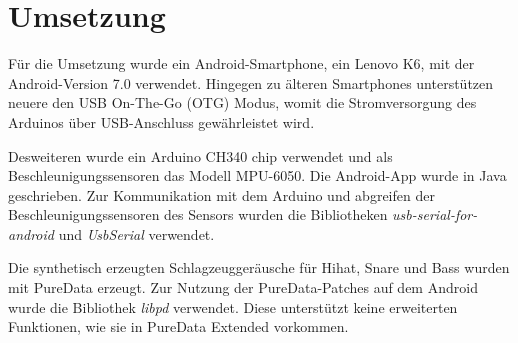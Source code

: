 \section{Umsetzung}
Für die Umsetzung wurde ein Android-Smartphone, ein Lenovo K6, mit der Android-Version 7.0 verwendet.
Hingegen zu älteren Smartphones unterstützen neuere den USB On-The-Go (OTG) Modus, womit die Stromversorgung des Arduinos über USB-Anschluss gewährleistet wird.

Desweiteren wurde ein Arduino CH340 chip verwendet und als Beschleunigungssensoren das Modell MPU-6050.
Die Android-App wurde in Java geschrieben.
Zur Kommunikation mit dem Arduino und abgreifen der Beschleunigungssensoren des Sensors wurden die Bibliotheken \textit{usb-serial-for-android} \cite{mik3y} und \textit{UsbSerial} \cite{felHR85} verwendet.

Die synthetisch erzeugten Schlagzeuggeräusche für Hihat, Snare und Bass wurden mit PureData erzeugt. 
Zur Nutzung der PureData-Patches auf dem Android wurde die Bibliothek \textit{libpd} verwendet.
Diese unterstützt keine erweiterten Funktionen, wie sie in PureData Extended vorkommen.